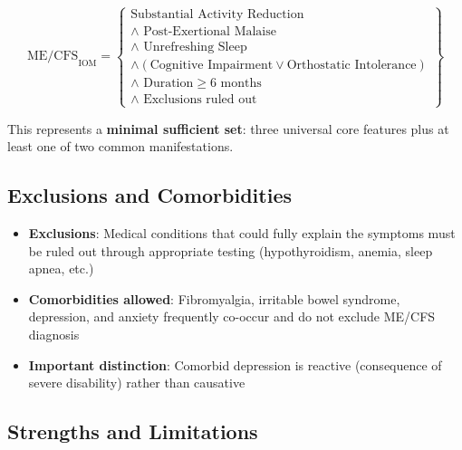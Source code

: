 \begin{equation}
\text{ME/CFS}_{\text{IOM}} = \left\{
\begin{array}{l}
\text{Substantial Activity Reduction} \\
\land \text{ Post-Exertional Malaise} \\
\land \text{ Unrefreshing Sleep} \\
\land \left( \text{Cognitive Impairment} \lor \text{Orthostatic Intolerance} \right) \\
\land \text{ Duration} \geq 6 \text{ months} \\
\land \text{ Exclusions ruled out}
\end{array}
\right\}
\end{equation}

This represents a \textbf{minimal sufficient set}: three universal core features plus at least one of two common manifestations.

\subsection{Exclusions and Comorbidities}

\begin{itemize}
    \item \textbf{Exclusions}: Medical conditions that could fully explain the symptoms must be ruled out through appropriate testing (hypothyroidism, anemia, sleep apnea, etc.)
    \item \textbf{Comorbidities allowed}: Fibromyalgia, irritable bowel syndrome, depression, and anxiety frequently co-occur and do not exclude ME/CFS diagnosis
    \item \textbf{Important distinction}: Comorbid depression is reactive (consequence of severe disability) rather than causative
\end{itemize}

\subsection{Strengths and Limitations}

